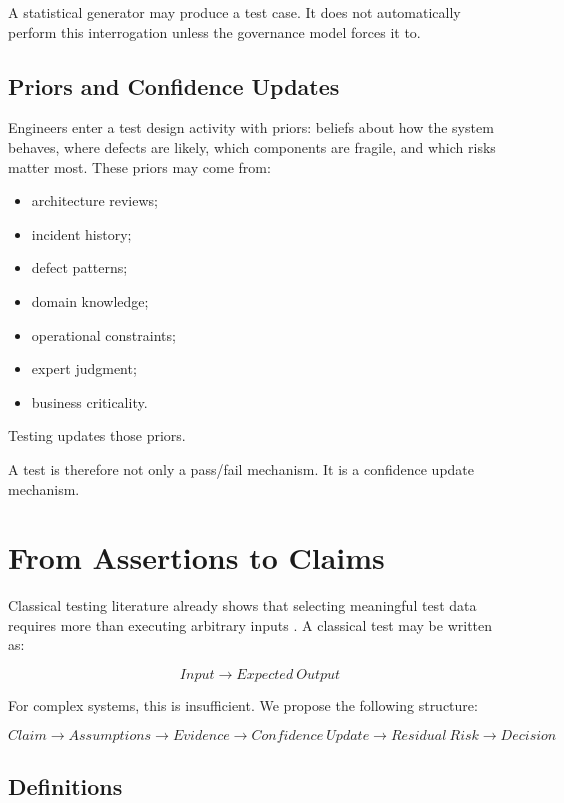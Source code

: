 \documentclass[11pt,a4paper]{article}
\begin{document}
A statistical generator may produce a test case. It does not automatically perform this interrogation unless the governance model forces it to.

\subsection{Priors and Confidence Updates}

Engineers enter a test design activity with priors: beliefs about how the system behaves, where defects are likely, which components are fragile, and which risks matter most. These priors may come from:
\begin{itemize}
\item architecture reviews;
\item incident history;
\item defect patterns;
\item domain knowledge;
\item operational constraints;
\item expert judgment;
\item business criticality.
\end{itemize}

Testing updates those priors.

A test is therefore not only a pass/fail mechanism. It is a confidence update mechanism.

\section{From Assertions to Claims}

Classical testing literature already shows that selecting meaningful test data requires more than executing arbitrary inputs \cite{goodenough,myers}. A classical test may be written as:

\[
Input \rightarrow Expected\ Output
\]

For complex systems, this is insufficient. We propose the following structure:

\[
Claim \rightarrow Assumptions \rightarrow Evidence \rightarrow Confidence\ Update \rightarrow Residual\ Risk \rightarrow Decision
\]

\subsection{Definitions}
\end{document}
